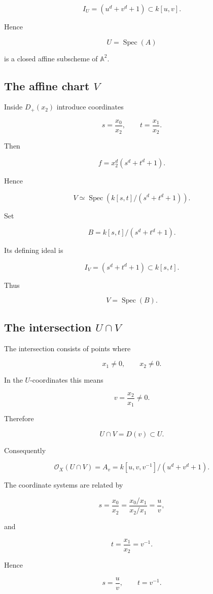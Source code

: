 \documentclass[12pt,a4paper]{article}
\theoremstyle{notespace}
\begin{document}
\[
I_U=(u^d+v^d+1)\subset k[u,v].
\]

Hence

\[
U=\operatorname{Spec}(A)
\]

is a closed affine subscheme of \(\mathbb A^2\).

\subsection{The affine chart \(V\)}

Inside \(D_+(x_2)\) introduce coordinates

\[
s=\frac{x_0}{x_2},
\qquad
t=\frac{x_1}{x_2}.
\]

Then

\[
f=x_2^d(s^d+t^d+1).
\]

Hence

\[
V
\simeq
\operatorname{Spec}
\left(
k[s,t]/(s^d+t^d+1)
\right).
\]

Set

\[
B=
k[s,t]/(s^d+t^d+1).
\]

Its defining ideal is

\[
I_V=(s^d+t^d+1)\subset k[s,t].
\]

Thus

\[
V=\operatorname{Spec}(B).
\]

\subsection{The intersection \(U\cap V\)}

The intersection consists of points where

\[
x_1\neq 0,
\qquad
x_2\neq 0.
\]

In the \(U\)-coordinates this means

\[
v=\frac{x_2}{x_1}\neq 0.
\]

Therefore

\[
U\cap V=D(v)\subset U.
\]

Consequently

\[
\mathcal O_X(U\cap V)
=
A_v
=
k[u,v,v^{-1}]
/
(u^d+v^d+1).
\]

The coordinate systems are related by

\[
s=\frac{x_0}{x_2}
=
\frac{x_0/x_1}{x_2/x_1}
=
\frac{u}{v},
\]

and

\[
t=\frac{x_1}{x_2}
=
v^{-1}.
\]

Hence

\[
s=\frac{u}{v},
\qquad
t=v^{-1}.
\]
\end{document}
